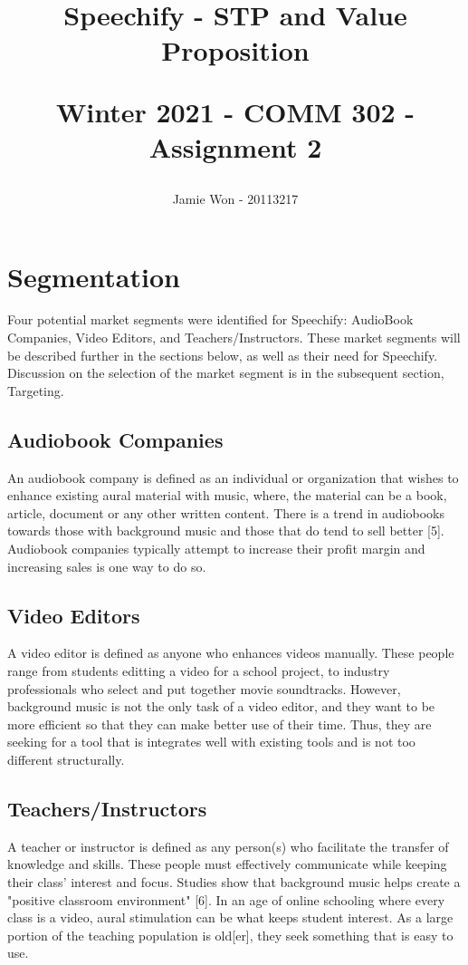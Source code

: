 \documentclass[letterpaper]{article}
\title{
    Speechify - STP and Value Proposition\\
    \begin{large}
        Winter 2021 - COMM 302 - Assignment 2
    \end{large}
}
\author{Jamie Won - 20113217}
\begin{document}
\maketitle
\tableofcontents
\cleardoublepage

\section{Segmentation}
    Four potential market segments were identified for Speechify: AudioBook Companies, Video Editors, and Teachers/Instructors. These market segments will be described further in the sections below, as well as their need for Speechify. Discussion on the selection of the market segment is in the subsequent section, Targeting.
    \subsection{Audiobook Companies}
        An audiobook company is defined as an individual or organization that wishes to enhance existing aural material with music, where, the material can be a book, article, document or any other written content. There is a trend in audiobooks towards those with background music and those that do tend to sell better [5]. Audiobook companies typically attempt to increase their profit margin and increasing sales is one way to do so.
    \subsection{Video Editors}
        A video editor is defined as anyone who enhances videos manually. These people range from students editting a video for a school project, to industry professionals who select and put together movie soundtracks. However, background music is not the only task of a video editor, and they want to be more efficient so that they can make better use of their time. Thus, they are seeking for a tool that is integrates well with existing tools and is not too different structurally.
    \subsection{Teachers/Instructors}
        A teacher or instructor is defined as any person(s) who facilitate the transfer of knowledge and skills. These people must effectively communicate while keeping their class' interest and focus. Studies show that background music helps create a "positive classroom environment" [6]. In an age of online schooling where every class is a video, aural stimulation can be what keeps student interest. As a large portion of the teaching population is old[er], they seek something that is easy to use.
\end{document}

